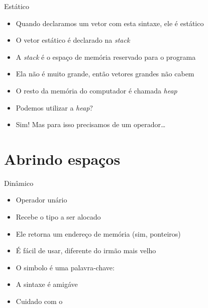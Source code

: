\documentclass[14pt]{beamer}
\begin{document}
		\begin{frame}{Estático}
			\begin{itemize}
				\presentationPause\item Quando declaramos um vetor com esta sintaxe, ele é estático
				\presentationPause\item O vetor estático é declarado na \textit{stack}
				\presentationPause\item A \textit{stack} é o espaço de memória reservado para o programa
				\presentationPause\item Ela não é muito grande, então vetores grandes não cabem
				\presentationPause\item O resto da memória do computador é chamada \textit{heap}
				\presentationPause\item Podemos utilizar a \textit{heap}?
				\presentationPause\item Sim! \presentationPause Mas para isso precisamos de um operador\dots
			\end{itemize}
		\end{frame}

	\section{Abrindo espaços}
		\begin{frame}{Dinâmico}
			\begin{itemize}
				\presentationPause\item Operador unário
				\presentationPause\item Recebe o tipo a ser alocado
				\presentationPause\item Ele retorna um endereço de memória \presentationPause(sim, ponteiros)
				\presentationPause\item É fácil de usar\presentationPause, diferente do irmão mais velho
				\presentationPause\item O simbolo é uma palavra-chave: \presentationPause{}
				\presentationPause\item A sintaxe é amigáve
			\end{itemize}
			\presentationPause
			\presentationPause
			\begin{itemize}
				\presentationPause\item Cuidado com o 
			\end{itemize}
		\end{frame}
\end{document}
